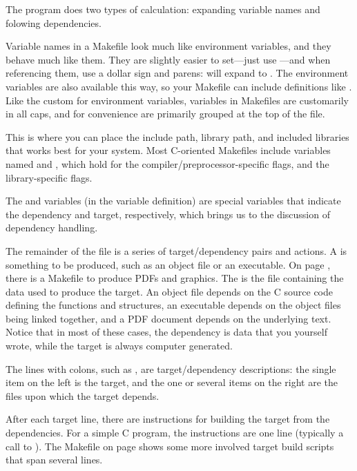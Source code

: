 The  program does two types of calculation: expanding variable
names and folowing dependencies. 

Variable names in a Makefile look much like environment
variables, and they behave much like them. They are slightly easier to
set---just use ---and when referencing them, use a
dollar sign and parens:  will expand to .
The environment variables are also available this way, so
your Makefile can include definitions like .  Like the custom for environment
variables, variables in Makefiles are customarily in all caps, and for
convenience are primarily grouped at the top of the file. 

This is where you can place the include path, library path, and included
libraries that works best for your system. Most C-oriented Makefiles
include variables named  and , which hold
for the compiler/preprocessor-specific flags, and the library-specific
flags.

The \ci{\$<} and  variables (in the  variable
definition) are special variables that indicate the dependency and target,
respectively, which brings us to the discussion of dependency handling.

The remainder of the file is a series of target/dependency pairs and
actions. A  is something to be produced, such as an object
file or an executable. On page \pageref{latexmake}, there is a Makefile
to produce PDFs and graphics. The  is the file
containing the data used to produce the target. An object file depends
on the C source code defining the functions and structures, an
executable depends on the object files being linked together, and a PDF
document depends on the underlying text. Notice that in most of these
cases, the dependency is data that you yourself wrote, while the target is
always computer generated. 

The lines with colons, such as , are
target/dependency descriptions: the single item on the left is the
target, and the one or several items on the right are the files upon
which the target depends.

After each target line, there are instructions for building the target
from the dependencies. For a simple C program, the instructions are one
line (typically a call to ). The Makefile on page
\pageref{latexmake} shows some more involved target build scripts that
span several lines. 

